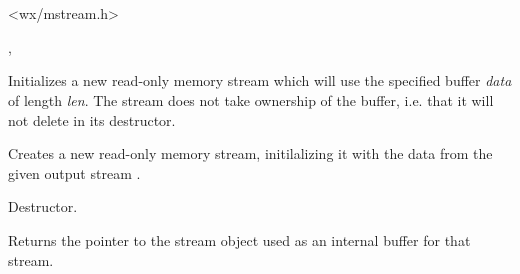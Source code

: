 \section{}\label{wxmeminputstream}




<wx/mstream.h>


, 


\label{wxmemoryinputstreamctor}


Initializes a new read-only memory stream which will use the specified buffer
{\it data} of length {\it len}. The stream does not take ownership of the 
buffer, i.e. that it will not delete in its destructor.


Creates a new read-only memory stream, initilalizing it with the
data from the given output stream .

\label{wxmemoryinputstreamdtor}


Destructor.

\label{wxmemoryinputstreamgetistrmbuf}


Returns the pointer to the stream object used as an internal buffer
for that stream.

